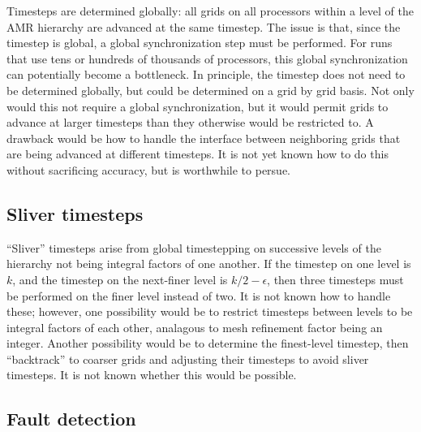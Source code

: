 \documentclass{article}
\begin{document}

  Timesteps are determined globally: all grids on all processors
  within a level of the AMR hierarchy are advanced at the same
  timestep.  The issue is that, since the timestep is global, a global
  synchronization step must be performed.  For runs that use tens or
  hundreds of thousands of processors, this global synchronization can
  potentially become a bottleneck.  In principle, the timestep does
  not need to be determined globally, but could be determined on a
  grid by grid basis.  Not only would this not require a global
  synchronization, but it would permit grids to advance at larger
  timesteps than they otherwise would be restricted to.  A drawback
  would be how to handle the interface between neighboring grids that
  are being advanced at different timesteps.  It is not yet known how
  to do this without sacrificing accuracy, but is worthwhile to
  persue.

\subsection{Sliver timesteps} \label{issue:method-timestep-sliver}

  ``Sliver'' timesteps arise from global timestepping on successive
  levels of the hierarchy not being integral factors of one another.
  If the timestep on one level is $k$, and the timestep on the
  next-finer level is $k/2-\epsilon$, then three timesteps must be
  performed on the finer level instead of two.  It is not known how to
  handle these; however, one possibility would be to restrict
  timesteps between levels to be integral factors of each other,
  analagous to mesh refinement factor being an integer.  Another
  possibility would be to determine the finest-level timestep, then
  ``backtrack'' to coarser grids and adjusting their timesteps to
  avoid sliver timesteps.  It is not known whether this would be
  possible.

\subsection{Fault detection} \label{issue:fault-detect}
\end{document}
